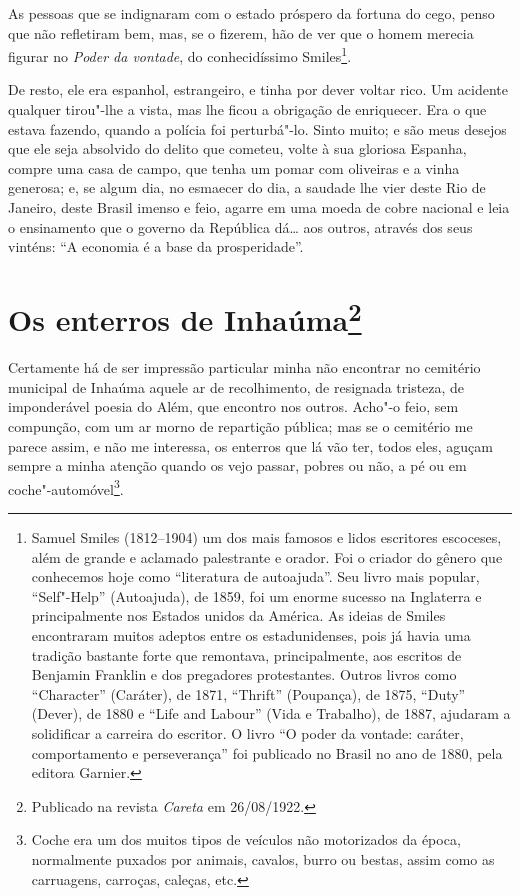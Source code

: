 As pessoas que se indignaram com o estado próspero da fortuna do cego,
penso que não refletiram bem, mas, se o fizerem, hão de ver que o homem
merecia figurar no \emph{Poder da vontade}, do conhecidíssimo
Smiles\footnote{Samuel Smiles (1812--1904) um dos mais famosos e lidos
  escritores escoceses, além de grande e aclamado palestrante e orador.
  Foi o criador do gênero que conhecemos hoje como ``literatura de
  autoajuda''. Seu livro mais popular, ``Self"-Help'' (Autoajuda), de
  1859, foi um enorme sucesso na Inglaterra e principalmente nos Estados
  unidos da América. As ideias de Smiles encontraram muitos adeptos
  entre os estadunidenses, pois já havia uma tradição bastante forte que
  remontava, principalmente, aos escritos de Benjamin Franklin e dos
  pregadores protestantes. Outros livros como ``Character'' (Caráter),
  de 1871, ``Thrift'' (Poupança), de 1875, ``Duty'' (Dever), de 1880 e
  ``Life and Labour'' (Vida e Trabalho), de 1887, ajudaram a solidificar
  a carreira do escritor. O livro ``O poder da vontade: caráter,
  comportamento e perseverança'' foi publicado no Brasil no ano de 1880,
  pela editora Garnier.}.

De resto, ele era espanhol, estrangeiro, e tinha por dever voltar rico.
Um acidente qualquer tirou"-lhe a vista, mas lhe ficou a obrigação de
enriquecer. Era o que estava fazendo, quando a polícia foi perturbá"-lo.
Sinto muito; e são meus desejos que ele seja absolvido do delito que
cometeu, volte à sua gloriosa Espanha, compre uma casa de campo, que
tenha um pomar com oliveiras e a vinha generosa; e, se algum dia, no
esmaecer do dia, a saudade lhe vier deste Rio de Janeiro, deste Brasil
imenso e feio, agarre em uma moeda de cobre nacional e leia o
ensinamento que o governo da República dá\ldots{} aos outros, através
dos seus vinténs: ``A economia é a base da prosperidade''.



\chapter[Os enterros de Inhaúma]{Os enterros de Inhaúma\footnote[*]{Publicado na revista \emph{Careta} em 26/08/1922.}}

Certamente há de ser impressão particular minha não encontrar no
cemitério municipal de Inhaúma aquele ar de recolhimento, de resignada
tristeza, de imponderável poesia do Além, que encontro nos outros.
Acho"-o feio, sem compunção, com um ar morno de repartição pública; mas
se o cemitério me parece assim, e não me interessa, os enterros que lá
vão ter, todos eles, aguçam sempre a minha atenção quando os vejo
passar, pobres ou não, a pé ou em coche"-automóvel\footnote{Coche era um
  dos muitos tipos de veículos não motorizados da época, normalmente
  puxados por animais, cavalos, burro ou bestas, assim como as
  carruagens, carroças, caleças, etc.}.

